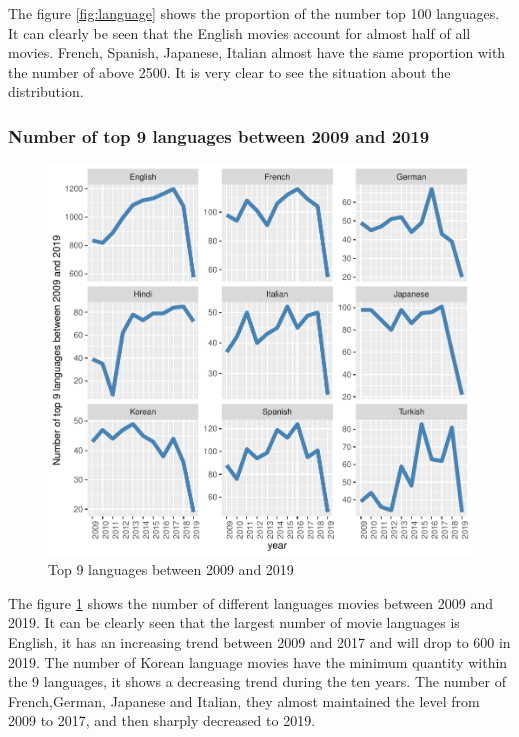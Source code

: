 \documentclass[11pt,a4paper,]{article}
\begin{document}
The figure \ref{fig:language} shows the proportion of the number top 100 languages. It can clearly be seen that the English movies account for almost half of all movies. French, Spanish, Japanese, Italian almost have the same proportion with the number of above 2500. It is very clear to see the situation about the distribution.

\hypertarget{number-of-top-9-languages-between-2009-and-2019}{%
\subsubsection{Number of top 9 languages between 2009 and 2019}\label{number-of-top-9-languages-between-2009-and-2019}}

\begin{figure}
\centering
\includegraphics{Report_files/figure-latex/langyear-1.pdf}
\caption{\label{fig:langyear}Top 9 languages between 2009 and 2019}
\end{figure}

The figure \ref{fig:langyear} shows the number of different languages movies between 2009 and 2019. It can be clearly seen that the largest number of movie languages is English, it has an increasing trend between 2009 and 2017 and will drop to 600 in 2019. The number of Korean language movies have the minimum quantity within the 9 languages, it shows a decreasing trend during the ten years. The number of French,German, Japanese and Italian, they almost maintained the level from 2009 to 2017, and then sharply decreased to 2019.
\end{document}
